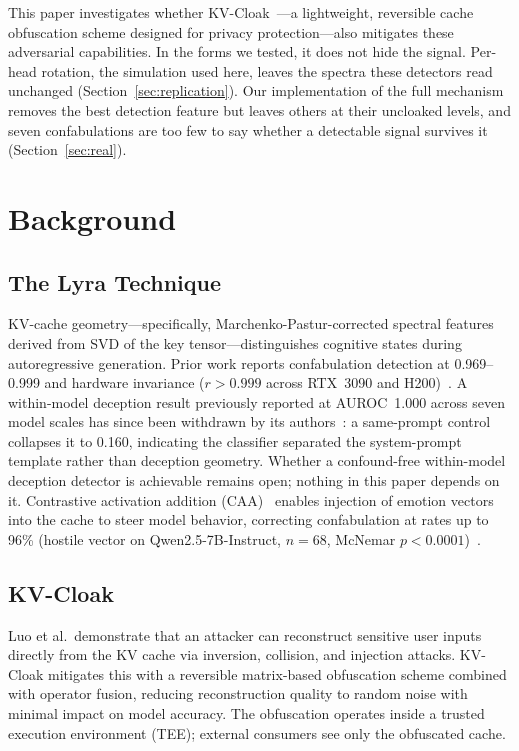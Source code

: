 This paper investigates whether KV-Cloak~\citep{luo2025shadow}---a
lightweight, reversible cache obfuscation scheme designed for privacy
protection---also mitigates these adversarial capabilities. In the forms
we tested, it does not hide the signal. Per-head rotation, the simulation
used here, leaves the spectra these detectors read unchanged
(Section~\ref{sec:replication}). Our implementation of the full mechanism
removes the best detection feature but leaves others at their uncloaked
levels, and seven confabulations are too few to say whether a detectable
signal survives it (Section~\ref{sec:real}).

\section{Background}

\subsection{The Lyra Technique}

KV-cache geometry---specifically, Marchenko-Pastur-corrected spectral
features derived from SVD of the key tensor---distinguishes cognitive
states during autoregressive generation. Prior work reports
confabulation detection at 0.969--0.999 and hardware invariance
($r>0.999$ across RTX~3090 and H200)~\citep{lyra2026oracle}. A
within-model deception result previously reported at AUROC~1.000 across
seven model scales has since been withdrawn by its authors~\citep{lyra2026techniqueii}: a
same-prompt control collapses it to 0.160, indicating the classifier
separated the system-prompt template rather than deception geometry.
Whether a confound-free within-model deception detector is achievable
remains open; nothing in this paper depends on it. Contrastive activation addition
(CAA)~\citep{panickssery2023caa} enables injection of emotion vectors into the cache to steer model
behavior, correcting confabulation at rates up to 96\% (hostile vector
on Qwen2.5-7B-Instruct, $n=68$, McNemar $p<0.0001$)~\citep{lyra2026formulary}.

\subsection{KV-Cloak}

Luo et al.\ demonstrate that an attacker can reconstruct sensitive user
inputs directly from the KV cache via inversion, collision, and
injection attacks. KV-Cloak mitigates this with a reversible
matrix-based obfuscation scheme combined with operator fusion, reducing
reconstruction quality to random noise with minimal impact on model
accuracy. The obfuscation operates inside a trusted execution
environment (TEE); external consumers see only the obfuscated cache.

